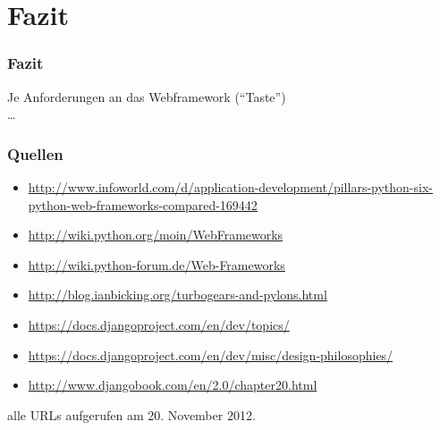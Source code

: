 \documentclass[
    t,
    smaller,
    compress,
    xcolor=svgnames,            %
    table,
]{beamer}
\begin{document}
\section{Fazit}
\begin{frame}
  \frametitle{Fazit}

  Je Anforderungen an das Webframework (“Taste”)\\
  \dots

\end{frame}


\begin{frame}
  \frametitle{Quellen}

  {\footnotesize

  \begin{itemize}[<1->]
    \item \url{http://www.infoworld.com/d/application-development/pillars-python-six-python-web-frameworks-compared-169442}
    \item \url{http://wiki.python.org/moin/WebFrameworks}
    \item \url{http://wiki.python-forum.de/Web-Frameworks}
    \item \url{http://blog.ianbicking.org/turbogears-and-pylons.html}
    \item \url{https://docs.djangoproject.com/en/dev/topics/}
    \item \url{https://docs.djangoproject.com/en/dev/misc/design-philosophies/}
    \item \url{http://www.djangobook.com/en/2.0/chapter20.html}
  \end{itemize}

  alle URLs aufgerufen am 20. November 2012.
  }
\end{frame}
\end{document}
